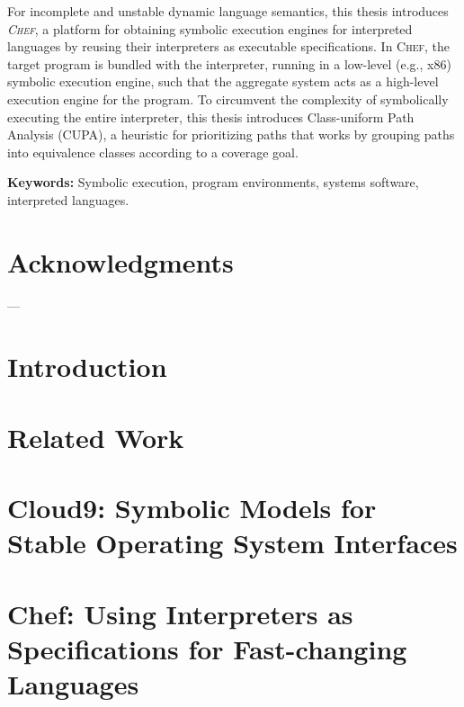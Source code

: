 \documentclass[letterpaper,10pt,oneside]{book}
\newcommand{\chef}{\textsc{Chef}\xspace}
\begin{document}
For incomplete and unstable dynamic language semantics, this thesis introduces \emph{\chef}, a platform for obtaining symbolic execution engines for interpreted languages by reusing their interpreters as executable specifications.  In \chef, the target program is bundled with the interpreter, running in a low-level (e.g., x86) symbolic execution engine, such that the aggregate system acts as a high-level execution engine for the program.
%
%
To circumvent the complexity of symbolically executing the entire interpreter, this thesis introduces Class-uniform Path Analysis (CUPA), a heuristic for prioritizing paths that works by grouping paths into equivalence classes according to a coverage goal.

\noindent \textbf{Keywords:} Symbolic execution, program environments, systems software, interpreted languages.


\chapter*{Acknowledgments}

---

\tableofcontents
\listoffigures
\listoftables

\chapter{Introduction}
\label{ch:introduction}



\chapter{Related Work}
\label{ch:relatedwork}



\chapter{Cloud9: Symbolic Models for Stable Operating System Interfaces}
\label{ch:cloud9}


\chapter{Chef: Using Interpreters as Specifications for Fast-changing Languages}
\label{ch:chef}

\end{document}
